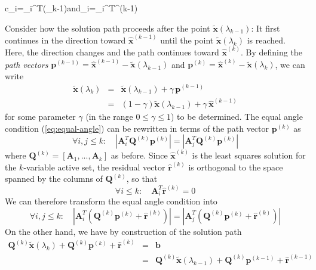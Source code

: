 c_{i}=_{i}^{T}\left(\lambda_{k-1}\right)\quad\mbox{and}\quad\rho_{i}=_{i}^{T}^{(k-1)}


Consider how the solution path proceeds after the point $\tilde{\mathbf{x}}\left(\lambda_{k-1}\right)$:
It first continues in the direction toward $\hat{\mathbf{x}}^{(k-1)}$
until the point $\tilde{\mathbf{x}}\left(\lambda_{k}\right)$ is reached.
Here, the direction changes and the path continues toward $\hat{\mathbf{x}}^{(k)}$.
By defining the \emph{path vectors} $\mathbf{p}^{(k-1)}=\hat{\mathbf{x}}^{(k-1)}-\tilde{\mathbf{x}}\left(\lambda_{k-1}\right)$
and $\mathbf{p}^{(k)}=\hat{\mathbf{x}}^{(k)}-\tilde{\mathbf{x}}\left(\lambda_{k}\right)$,
we can write
\begin{eqnarray}
\tilde{\mathbf{x}}\left(\lambda_{k}\right) & = & \tilde{\mathbf{x}}\left(\lambda_{k-1}\right)+\gamma\,\mathbf{p}^{(k-1)}\nonumber \\
 & = & \left(1-\gamma\right)\tilde{\mathbf{x}}\left(\lambda_{k-1}\right)+\gamma\,\hat{\mathbf{x}}^{(k-1)}\label{eq:path-vector}
\end{eqnarray}
for some parameter $\gamma$ (in the range $0\le\gamma\le1$) to be
determined. The equal angle condition (\ref{eq:equal-angle}) can
be rewritten in terms of the path vector $\mathbf{p}^{(k)}$ as
\begin{equation}
\forall i,j\le k:\quad\left|\mathbf{A}_{i}^{T}\mathbf{Q}^{(k)}\mathbf{p}^{(k)}\right|=\left|\mathbf{A}_{j}^{T}\mathbf{Q}^{(k)}\mathbf{p}^{(k)}\right|
\end{equation}
where $\mathbf{Q}^{(k)}=\left[\mathbf{A}_{1},...,\mathbf{A}_{k}\right]$
as before. Since $\hat{\mathbf{x}}^{(k)}$ is the least squares solution
for the $k$-variable active set, the residual vector $\hat{\mathbf{r}}^{(k)}$
is orthogonal to the space spanned by the columns of $\mathbf{Q}^{(k)}$,
so that 
\begin{equation}
\forall i\le k:\quad\mathbf{A}_{i}^{T}\hat{\mathbf{r}}^{(k)}=0
\end{equation}
We can therefore transform the equal angle condition into
\begin{equation}
\forall i,j\le k:\quad\left|\mathbf{A}_{i}^{T}\left(\mathbf{Q}^{(k)}\mathbf{p}^{(k)}+\hat{\mathbf{r}}^{(k)}\right)\right|=\left|\mathbf{A}_{j}^{T}\left(\mathbf{Q}^{(k)}\mathbf{p}^{(k)}+\hat{\mathbf{r}}^{(k)}\right)\right|
\end{equation}
On the other hand, we have by construction of the solution path 
\begin{eqnarray*}
\mathbf{Q}^{(k)}\tilde{\mathbf{x}}\left(\lambda_{k}\right)+\mathbf{Q}^{(k)}\mathbf{p}^{(k)}+\hat{\mathbf{r}}^{(k)} & = & \mathbf{b}\\
 & = & \mathbf{Q}^{(k)}\tilde{\mathbf{x}}\left(\lambda_{k-1}\right)+\mathbf{Q}^{(k)}\mathbf{p}^{(k-1)}+\hat{\mathbf{r}}^{(k-1)}
\end{eqnarray*}
